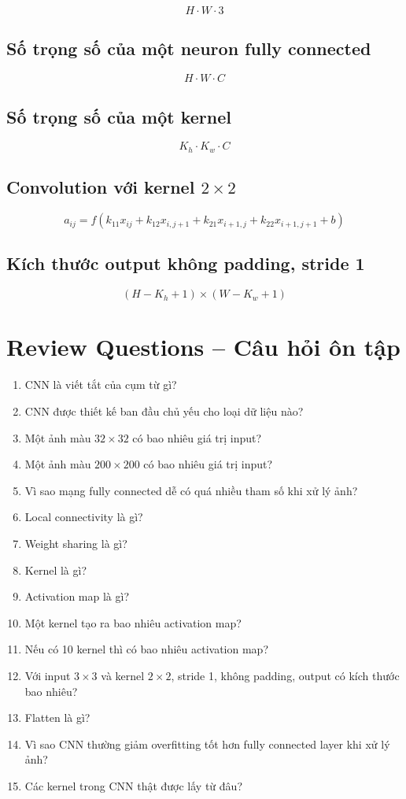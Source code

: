 \[
    H \cdot W \cdot 3
\]

\subsection*{Số trọng số của một neuron fully connected}

\[
    H \cdot W \cdot C
\]

\subsection*{Số trọng số của một kernel}

\[
    K_h \cdot K_w \cdot C
\]

\subsection*{Convolution với kernel $2\times2$}

\[
    a_{ij}
    =
    f(
    k_{11}x_{ij}
    +
    k_{12}x_{i,j+1}
    +
    k_{21}x_{i+1,j}
    +
    k_{22}x_{i+1,j+1}
    +
    b
    )
\]

\subsection*{Kích thước output không padding, stride 1}

\[
    (H-K_h+1)\times(W-K_w+1)
\]

\section{Review Questions -- Câu hỏi ôn tập}

\begin{enumerate}
    \item CNN là viết tắt của cụm từ gì?
    \item CNN được thiết kế ban đầu chủ yếu cho loại dữ liệu nào?
    \item Một ảnh màu $32\times32$ có bao nhiêu giá trị input?
    \item Một ảnh màu $200\times200$ có bao nhiêu giá trị input?
    \item Vì sao mạng fully connected dễ có quá nhiều tham số khi xử lý ảnh?
    \item Local connectivity là gì?
    \item Weight sharing là gì?
    \item Kernel là gì?
    \item Activation map là gì?
    \item Một kernel tạo ra bao nhiêu activation map?
    \item Nếu có 10 kernel thì có bao nhiêu activation map?
    \item Với input $3\times3$ và kernel $2\times2$, stride 1, không padding, output có kích thước bao nhiêu?
    \item Flatten là gì?
    \item Vì sao CNN thường giảm overfitting tốt hơn fully connected layer khi xử lý ảnh?
    \item Các kernel trong CNN thật được lấy từ đâu?
\end{enumerate}


